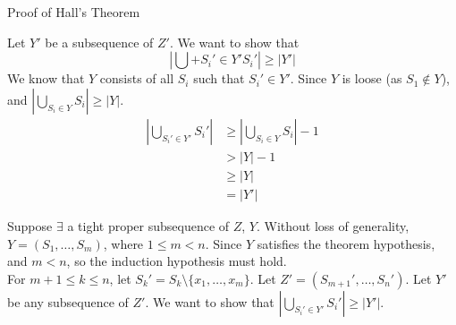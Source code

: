 \documentclass[10pt]{extarticle}
\begin{document}
{\begin{problem}{Proof of Hall's Theorem}
\begin{description}
\begin{description}[font=\normalfont\scshape]
            Let $Y'$ be a subsequence of $Z'$. We want to show that
            \[
              \left|\bigcup+{S_i'\in Y'} S_i' \right| \geq |Y'|
            \] 
            We know that $Y$ consists of all $S_i$ such that $S_i'\in Y'$. Since $Y$ is loose (as $S_1\notin Y$), and $\left|\bigcup_{S_i\in Y}S_i\right| \geq |Y|$.
            \begin{align*}
              \left|\bigcup_{S_i'\in Y'}S_i'\right| &\geq \left|\bigcup_{S_i\in Y}S_i\right|-1\\
              &> |Y| - 1\\
              &\geq |Y|\\
              &= |Y'|
            \end{align*}
          \item[Case 2:] Suppose $\exists$ a tight proper subsequence of $Z$, $Y$. Without loss of generality, $Y = (S_1,\dots,S_m)$, where $1\leq m < n$. Since $Y$ satisfies the theorem hypothesis, and $m < n$, so the induction hypothesis must hold.\\

            For $m+1 \leq k \leq n$, let $S_k' = S_k \setminus \{x_1,\dots,x_m\}$. Let $Z' = (S_{m+1}',\dots,S_n')$. Let $Y'$ be any subsequence of $Z'$. We want to show that $\left|\bigcup_{S_i'\in Y'} S_i'\right| \geq |Y'|$.\\


\end{description}
\end{description}
\end{problem}}
\end{document}
